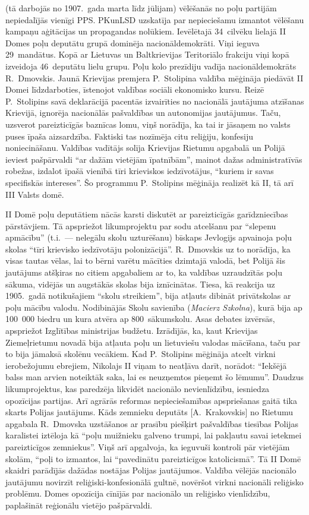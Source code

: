\documentclass[twoside,a5paper,12pt,fleqn,openany]{extbook}
\newcommand{\pltxti}[1]{\textit{\textpolish{#1}}}
\begin{document}
 (tā darbojās no 1907.~gada marta līdz jūlijam) vēlēšanās no poļu partijām nepiedalījās vienīgi PPS. PKunLSD uzskatīja par nepieciešamu izmantot vēlēšanu kampaņu aģitācijas un propagandas nolūkiem. Ievēlētajā 34~cilvēku lielajā II Domes poļu deputātu grupā dominēja nacionāldemokrāti. Viņi ieguva 29~mandātus. Kopā ar Lietuvas un Baltkrievijas Teritoriālo frakciju viņi kopā izveidoja 46~deputātu lielu grupu. Poļu kolo prezīdiju vadīja nacionāldemokrāts R.~Dmovskis. Jaunā Krievijas premjera P.~Stolipina valdība mēģināja piedāvāt II Domei līdzdarboties, īstenojot valdības sociāli ekonomisko kursu. Reizē P.~Stolipins savā deklarācijā pacentās izvairīties no nacionālā jautājuma atzīšanas Krievijā, ignorēja nacionālās pašvaldības un autonomijas jautājumus. Taču, uzsverot pareizticīgās baznīcas lomu, viņš norādīja, ka tai ir jāsaņem no valsts puses īpaša aizsardzība. Faktiski tas nozīmēja citu reliģiju, konfesiju noniecināšanu. Valdības vadītājs solīja Krievijas Rietumu apgabalā un Polijā ieviest pašpārvaldi ``ar dažām vietējām īpatnībām'', mainot dažas administratīvās robežas, izdalot īpašā vienībā tīri krieviskos iedzīvotājus, ``kuriem ir savas specifiskās intereses''. Šo programmu P.~Stolipins mēģināja realizēt kā II, tā arī III Valsts domē.

II Domē poļu deputātiem nācās karsti diskutēt ar pareizticīgās garīdzniecības pārstāvjiem. Tā apspriežot likumprojektu par sodu atcelšanu par ``slepenu apmācību'' (t.i.~--- nelegālu skolu uzturēšanu) bīskaps Jevlogijs apvainoja poļu skolas ``tīri krievisko iedzīvotāju polonizācijā''. R.~Dmovskis uz to norādīja, ka visas tautas vēlas, lai to bērni varētu mācīties dzimtajā valodā, bet Polijā šis jautājums atšķiras no citiem apgabaliem ar to, ka valdības uzraudzītās poļu sākuma, vidējās un augstākās skolas bija iznīcinātas. Tiesa, kā reakcija uz 1905.~gadā notikušajiem ``skolu streikiem'', bija atļauts dibināt privātskolas ar poļu mācību valodu. Nodibinājās Skolu savienība (\pltxti{Macierz Szkolna}), kurā bija ap 100~000 biedru un kura atvēra ap 800~sākumskolu. Asas debates izvērsās, apspriežot Izglītības ministrijas budžetu. Izrādījās, ka, kaut Krievijas Ziemeļrietumu novadā bija atļauta poļu un lietuviešu valodas mācīšana, taču par to bija jāmaksā skolēnu vecākiem. Kad P.~Stolipins mēģināja atcelt virkni ierobežojumu ebrejiem, Nikolajs II viņam to neatļāva darīt, norādot: ``Iekšējā balss man arvien noteiktāk saka, lai es neuzņemtos pieņemt šo lēmumu''. Daudzus likumprojektus, kas paredzēja likvidēt nacionālo nevienlīdzību, iesniedza opozīcijas partijas. Arī agrārās reformas nepieciešamības apspriešanas gaitā tika skarts Polijas jautājums. Kāds zemnieku deputāts [A.~Krakovskis] no Rietumu apgabala R.~Dmovska uzstāšanos ar prasību piešķirt pašvaldības tiesības Polijas karalistei iztēloja kā ``poļu muižnieku galveno trumpi, lai pakļautu savai ietekmei pareizticīgos zemniekus''. Viņš arī apgalvoja, ka ieguvuši kontroli pār vietējām skolām, ``poļi to izmantos, lai ``pavedinātu pareizticīgos katolicismā''. Tā II Domē skaidri parādījās dažādas nostājas Polijas jautājumos. Valdība vēlējās nacionālo jautājumu novirzīt reliģiski-konfesionālā gultnē, novēršot virkni nacionāli reliģisko problēmu. Domes opozīcija cīnījās par nacionālo un reliģisko vienlīdzību, paplašināt reģionālu vietējo pašpārvaldi.
\end{document}
